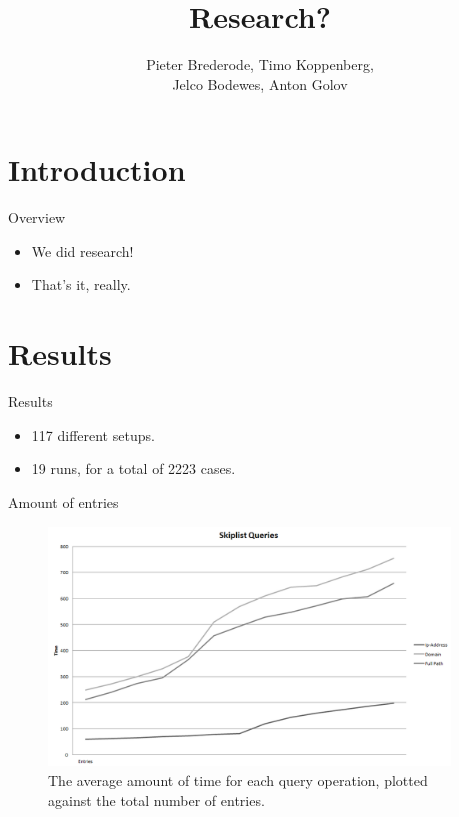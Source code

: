 \documentclass[10pt]{beamer}
\title{Research?}
\author{Pieter Brederode, Timo Koppenberg, \\ Jelco Bodewes, Anton Golov}
\institute{B3OMI}
\begin{document}
\begin{frame}
    \maketitle
\end{frame}


\section{Introduction}
\begin{frame}{Overview}
    \begin{itemize}
        \item We did research!
        \item That's it, really.
    \end{itemize}
\end{frame}

\section{Results}

\begin{frame}{Results}
    \begin{itemize}
        \item 117 different setups.
        \item 19 runs, for a total of 2223 cases.
    \end{itemize}
\end{frame}

\begin{frame}{Amount of entries}
	\begin{figure}
	  \centering
	    \includegraphics[width=0.95\textwidth]{SkiplistQuery}
	  \caption{The average amount of time for each query operation, plotted against the total number of entries.}
	\end{figure}
\end{frame}
\end{document}
